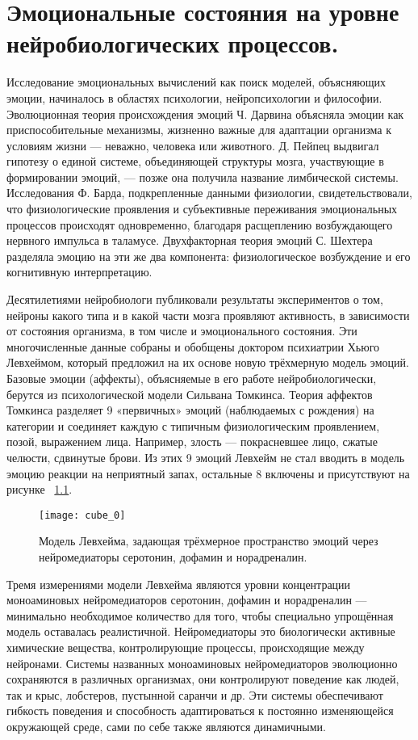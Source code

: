 \chapter{Эмоциональные состояния на уровне нейробиологических процессов.}
\label{chap:theoretical_development}

Исследование эмоциональных вычислений как поиск моделей, объясняющих эмоции, начиналось в областях психологии, нейропсихологии и философии. Эволюционная теория происхождения эмоций Ч. Дарвина объясняла эмоции как приспособительные механизмы, жизненно важные для адаптации организма к условиям жизни — неважно, человека или животного. Д. Пейпец выдвигал гипотезу о единой системе, объединяющей структуры мозга, участвующие в формировании эмоций, — позже она получила название лимбической системы. Исследования Ф. Барда, подкрепленные данными физиологии, свидетельствовали, что физиологические проявления и субъективные переживания эмоциональных процессов происходят одновременно, благодаря расщеплению возбуждающего нервного импульса в таламусе. Двухфакторная теория эмоций С. Шехтера разделяла эмоцию на эти же два компонента: физиологическое возбуждение и его когнитивную интерпретацию.


Десятилетиями нейробиологи публиковали результаты экспериментов о том, нейроны какого типа и в какой части мозга проявляют активность, в зависимости от состояния организма, в том числе и эмоционального состояния. Эти многочисленные данные собраны и обобщены доктором психиатрии Хьюго Левхеймом, который предложил на их основе новую трёхмерную модель эмоций.\cite{lovheim2012} Базовые эмоции (аффекты), объясняемые в его работе нейробиологически, берутся из психологической модели Сильвана Томкинса.\cite{tomkins1962, tomkins1963, tomkins1991} Теория аффектов Томкинса разделяет 9 «первичных» эмоций (наблюдаемых с рождения) на категории и соединяет каждую с типичным физиологическим проявлением, позой, выражением лица. Например, злость — покрасневшее лицо, сжатые челюсти, сдвинутые брови. Из этих 9 эмоций Левхейм не стал вводить в модель эмоцию реакции на неприятный запах, остальные 8 включены и присутствуют на рисунке ~\ref{fig:cube_0}.


\begin{figure}
	\centering
	\texttt{[image: cube\_0]}
	\caption{Модель Левхейма, задающая трёхмерное пространство эмоций через нейромедиаторы серотонин, дофамин и норадреналин.}
	\label{fig:cube_0}
\end{figure}


Тремя измерениями модели Левхейма являются уровни концентрации моноаминовых нейромедиаторов серотонин, дофамин и норадреналин — минимально необходимое количество для того, чтобы специально упрощённая модель оставалась реалистичной. Нейромедиаторы это биологически активные химические вещества,  контролирующие процессы, происходящие между нейронами. Системы названных моноаминовых нейромедиаторов эволюционно сохраняются в различных организмах, они контролируют поведение как людей, так и крыс, лобстеров, пустынной саранчи и др. Эти системы обеспечивают гибкость поведения и способность адаптироваться к постоянно изменяющейся окружающей среде, сами по себе также являются динамичными.\cite{Benarroch17112009}


